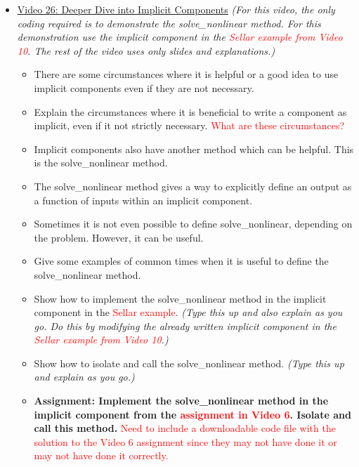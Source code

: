 \documentclass[12pt, letterpaper]{article}
\begin{document}
\begin{itemize}
	\item \underline{Video 26: Deeper Dive into Implicit Components} \textit{(For this video, the only coding required is to demonstrate the solve\_nonlinear method. For this demonstration use the implicit component in the \textcolor{red}{Sellar example from Video 10}. The rest of the video uses only slides and explanations.)}
		\begin{itemize}
			\item There are some circumstances where it is helpful or a good idea to use implicit components even if they are not necessary.
			\item Explain the circumstances where it is beneficial to write a component as implicit, even if it not strictly necessary. \textcolor{red}{What are these circumstances?}
			\item Implicit components also have another method which can be helpful. This is the solve\_nonlinear method.
			\item The solve\_nonlinear method gives a way to explicitly define an output as a function of inputs within an implicit component.
			\item Sometimes it is not even possible to define solve\_nonlinear, depending on the problem. However, it can be useful.
			\item Give some examples of common times when it is useful to define the solve\_nonlinear method.
			\item Show how to implement the solve\_nonlinear method in the implicit component in the \textcolor{red}{Sellar example}. \textit{(Type this up and also explain as you go. Do this by modifying the already written implicit component in the \textcolor{red}{Sellar example from Video 10}.)}
			\item Show how to isolate and call the solve\_nonlinear method. \textit{(Type this up and explain as you go.)}
			\item \textbf{Assignment: Implement the solve\_nonlinear method in the implicit component from the \textcolor{red}{assignment in Video 6}. Isolate and call this method.} \textcolor{red}{Need to include a downloadable code file with the solution to the Video 6 assignment since they may not have done it or may not have done it correctly.}
		\end{itemize}


\end{itemize}
\end{document}
